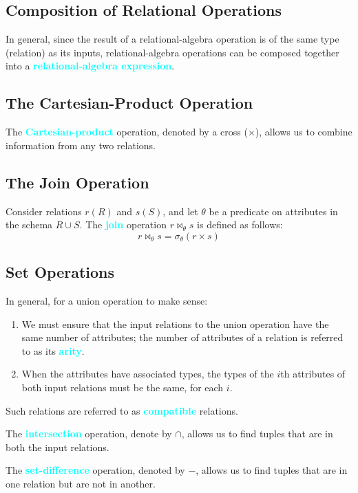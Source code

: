 \documentclass{Beautybook-EN}
\newcommand{\textcy}[1]{\textbf{\textcolor{cyan}{#1}}}
\begin{document}
\subsection{Composition of Relational Operations}

In general, since the result of a relational-algebra operation is of the same type (relation) as its inputs, relational-algebra operations can be composed together into a \textcy{relational-algebra expression}.

\subsection{The Cartesian-Product Operation}

The \textcy{Cartesian-product} operation, denoted by a cross ($\times$), allows us to combine information from any two relations.

\subsection{The Join Operation}

Consider relations $r(R)$ and $s(S)$, and let $\theta$ be a predicate on attributes in the schema $R\cup S$. The \textcy{join} operation $r\bowtie_{\theta}s$ is defined as follows: $$r\bowtie_{\theta}s=\sigma_{\theta}(r\times s)$$

\subsection{Set Operations}

In general, for a union operation to make sense:
\begin{enumerate}
    \item We must ensure that the input relations to the union operation have the same number of attributes; the number of attributes of a relation is referred to as its \textcy{arity}.
    \item When the attributes have associated types, the types of the $i$th attributes of both input relations must be the same, for each $i$.
\end{enumerate}
Such relations are referred to as \textcy{compatible} relations.

The \textcy{intersection} operation, denote by $\cap$, allows us to find tuples that are in both the input relations.

The \textcy{set-difference} operation, denoted by $-$, allows us to find tuples that are in one relation but are not in another.
\end{document}
